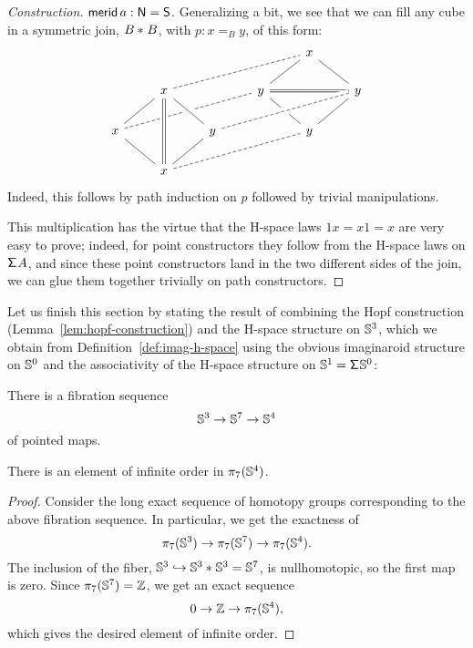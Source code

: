 \begin{proof}[Construction]
$\mathsf{merid}\,a:\mathsf{N}=\mathsf{S}$. Generalizing a bit, we see that we can fill
any cube in a symmetric join, ${B}\ast_{}{B}$, with $p:x=_By$, of this form:
\begin{equation*}
  \begin{tikzcd}[every arrow/.append style={-}]
    &   &   &   & x\arrow{dl}\arrow{dr} & \\
    & x\arrow{dl}\arrow{dr}\arrow[dashed]{urrr} &
    & y\arrow{dr}\arrow[-, double equal sign distance]{rr} & & y\arrow{dl} \\
    x\arrow{dr}\arrow[dashed]{urrr} & &
    y\arrow[crossing over]{ul}\arrow{dl}\arrow[dashed,crossing over]{urrr} &
    & y & \\
    & x\arrow[-, double equal sign distance,crossing over]{uu}\arrow[dashed]{urrr} & & & &
  \end{tikzcd}
\end{equation*}
Indeed, this follows by path induction on $p$ followed by trivial
manipulations.

This multiplication has the virtue that the H-space laws $1x=x1=x$ are
very easy to prove; indeed, for point constructors they follow from
the H-space laws on $\mathsf{\Sigma}^{} A$, and since these point constructors land
in the two different sides of the join, we can glue them together
trivially on path constructors.
\end{proof}

Let us finish this section by stating the result of combining
the Hopf construction (Lemma~\ref{lem:hopf-construction}) and the
H-space structure on $\mathbb{S}^3$, which we obtain from
Definition~\ref{def:imag-h-space} using the obvious imaginaroid
structure on $\mathbb{S}^0$ and the associativity of the H-space structure on
$\mathbb{S}^1=\mathsf{\Sigma}^{}\mathbb{S}^0$:
\begin{thm}
  There is a fibration sequence
  \[
    \mathbb{S}^3 \to \mathbb{S}^7 \to \mathbb{S}^4
  \]
  of pointed maps.
\end{thm}
\begin{cor}
  There is an element of infinite order in $\pi_7(\mathbb{S}^4)$.
\end{cor}
\begin{proof}
  Consider the long exact sequence of homotopy groups
  \cite[Theorem~8.4.6]{TheBook} corresponding to the above fibration
  sequence. In particular, we get the exactness of
  \[
    \pi_7(\mathbb{S}^3) \to \pi_7(\mathbb{S}^7) \to \pi_7(\mathbb{S}^4).
  \]
  The inclusion of the fiber, $\mathbb{S}^3 \hookrightarrow
  {\mathbb{S}^3}\ast_{}{\mathbb{S}^3} = \mathbb{S}^7$, is nullhomotopic, so the first map is
  zero. Since $\pi_7(\mathbb{S}^7) = \mathbb{Z}$, we get an exact sequence
  \[
    0 \to \mathbb{Z} \to \pi_7(\mathbb{S}^4),
  \]
  which gives the desired element of infinite order.
\end{proof}
